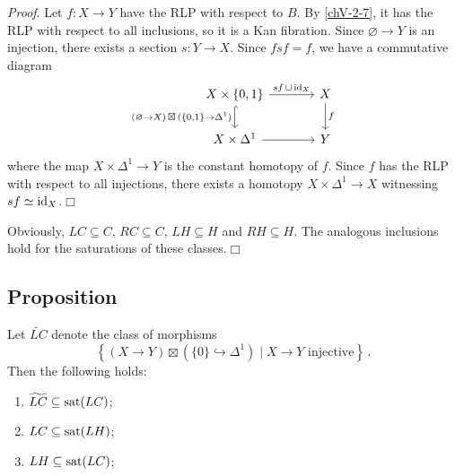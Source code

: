        \emph{Proof}. Let $f \colon X \to Y$ have the RLP with respect to $B$. By \ref{chV-2-7}, it has the RLP with respect to all inclusions, so it is a Kan fibration. Since $\varnothing \to Y$ is an injection, there exists a section $s \colon Y \to X$. Since $fsf = f$, we have a commutative diagram
        \begin{equation*}
            \begin{tikzcd}[column sep=large]
                X \times \{0, 1\} \arrow[r, "sf \,\sqcup\, \id_X"] \arrow[d, hook, "(\varnothing \to X) \,\boxtimes\, (\{0{,}1\} \to \Delta^1)"'] & X \arrow[d, "f"] \\
                X \times \Delta^1 \arrow[r] & Y
            \end{tikzcd}
        \end{equation*}
        where the map $X \times \Delta^1 \to Y$ is the constant homotopy of $f$. Since $f$ has the RLP with respect to all injections, there exists a homotopy $X \times \Delta^1 \to X$ witnessing $sf \simeq \operatorname{id}_X$.\hfill$\Box$

        Obviously, $LC \subseteq C$, $RC \subseteq C$, $LH \subseteq H$ and $RH \subseteq H$. The analogous inclusions hold for the saturations of these classes.\hfill$\Box$

    \subsection{Proposition}\label{chV-2-9}
        Let $\widetilde{LC}$ denote the class of morphisms
        \begin{equation*}
            \left\{ (X \to Y) \boxtimes (\{0\} \hookrightarrow \Delta^1) \mid X \to Y \text{ injective} \right\}\,.
        \end{equation*}
        Then the following holds:
        \begin{enumerate}[label=\roman*)]
            \item 
                $\widetilde{LC} \subseteq \operatorname{sat}(LC)$;\label{chV-2-9-1}
            \item 
                $LC \subseteq \operatorname{sat}(LH)$;\label{chV-2-9-2}
            \item 
                $LH \subseteq \operatorname{sat}(LC)$;\label{chV-2-9-3}
        \end{enumerate}


